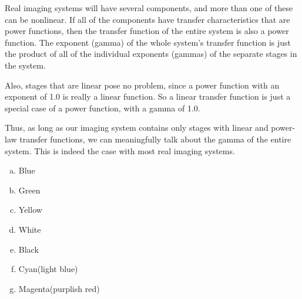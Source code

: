 Real imaging systems will have several components, and more than one
of these can be nonlinear. If all of the components have transfer
characteristics that are power functions, then the transfer function
of the entire system is also a power function. The exponent (gamma) of
the whole system's transfer function is just the product of all of the
individual exponents (gammas) of the separate stages in the system.

Also, stages that are linear pose no problem, since a power function
with an exponent of 1.0 is really a linear function. So a linear
transfer function is just a special case of a power function, with a
gamma of 1.0.

Thus, as long as our imaging system contains only stages with linear
and power-law transfer functions, we can meaningfully talk about the
gamma of the entire system. This is indeed the case with most real
imaging systems.

\begin{Answer}[ref={rgb-triplet}]
  \begin{enumerate}[(a)]
  \item Blue
  \item Green
  \item Yellow
  \item White
  \item Black
  \item Cyan(light blue)
  \item Magenta(purplish red)
  \end{enumerate}
\end{Answer}


